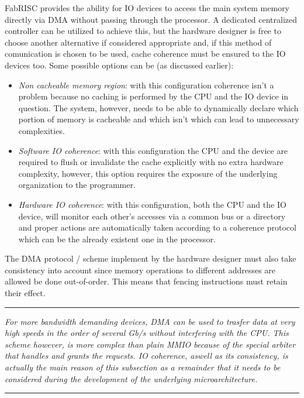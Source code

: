 \documentclass{article}
\begin{document}
            FabRISC provides the ability for IO devices to access the main system memory directly via DMA without passing through the processor. A dedicated centralized controller can be utilized to achieve this, but the hardware designer is free to choose another alternative if considered appropriate and, if this method of comunication is chosen to be used, cache coherence must be ensured to the IO devices too. Some possible options can be (as discussed earlier):

            \begin{itemize}

                \item \textit{Non cacheable memory region}: with this configuration coherence isn't a problem because no caching is performed by the CPU and the IO device in question. The system, however, needs to be able to dynamically declare which portion of memory is cacheable and which isn't which can lead to unnecessary complexities.
                \item \textit{Software IO coherence}: with this configuration the CPU and the device are required to flush or invalidate the cache explicitly with no extra hardware complexity, however, this option requires the exposure of the underlying organization to the programmer.
                \item \textit{Hardware IO coherence}: with this configuration, both the CPU and the IO device, will monitor each other's accesses via a common bus or a directory and proper actions are automatically taken according to a coherence protocol which can be the already existent one in the processor.

            \end{itemize}

            The DMA protocol / scheme implement by the hardware designer must also take consistency into account since memory operations to different addresses are allowed be done out-of-order. This means that fencing instructions must retain their effect.

        \par\noindent\rule{\textwidth}{0.4pt}
        \textit{For more bandwidth demanding devices, DMA can be used to trasfer data at very high speeds in the order of several Gb/s without interfering with the CPU. This scheme however, is more complex than plain MMIO because of the special arbiter that handles and grants the requests. IO coherence, aswell as its consistency, is actually the main reason of this subsection as a remainder that it needs to be considered during the development of the underlying microarchitecture.}
        \par\noindent\rule{\textwidth}{0.4pt}
\end{document}
